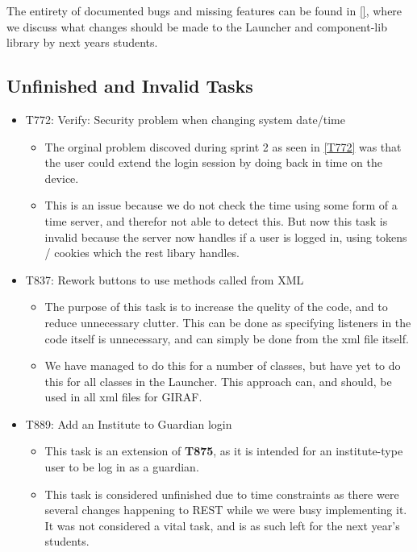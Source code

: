 The entirety of documented bugs and missing features can be found in \autoref{},
where we discuss what changes should be made to the Launcher and component-lib
library by next years students.


\subsection{Unfinished and Invalid Tasks}\label{S4Invalid}
\begin{itemize}
  \item T772: Verify: Security problem when changing system date/time
  	\begin{itemize}
  		\item The orginal problem discoved during sprint 2 as seen in \autoref{T772}
 		was that the user could extend the login session by doing back in time on the
  		device.
		\item This is an issue because we do not check the time using some form of a
		time server, and therefor not able to detect this.  
		But now this task is invalid because the server now handles if a user is
		logged in, using tokens / cookies which the rest libary handles.
		\end{itemize}
  \item T837: Rework buttons to use methods called from XML
	\begin{itemize}
	  \item The purpose of this task is to increase the quelity of the code, and to
	  reduce unnecessary clutter. This can be done as specifying listeners in the
	  code itself is unnecessary, and can simply be done from the xml file itself.
	  \item We have managed to do this for a number of classes, but have yet to
	  do this for all classes in the Launcher. This approach can, and should, be
	  used in all xml files for GIRAF.
	  \end{itemize}
  \item T889: Add an Institute to Guardian login \label{T889}
   \begin{itemize}
     \item This task is an extension of \textbf{T875}, as it is intended for an
     institute-type user to be log in as a guardian. 
     \item This task is considered unfinished due to time constraints as there
     were several changes happening to REST while we were busy implementing it.
     It was not considered a vital task, and is as such left for the next year's
     students.
   \end{itemize}
\end{itemize}

